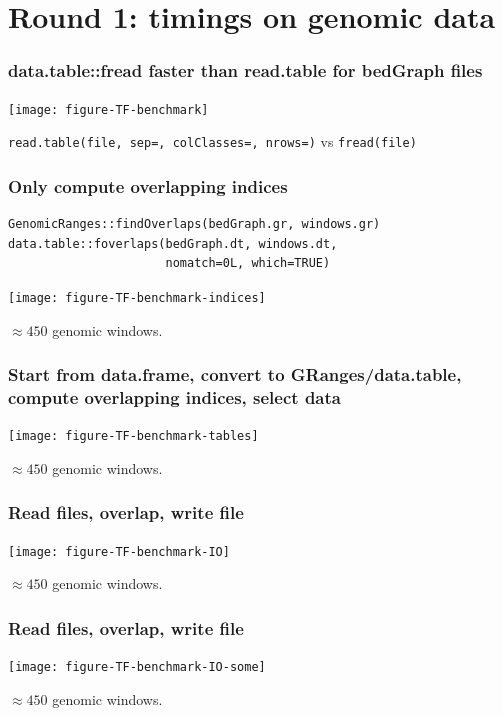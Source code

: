 \documentclass{beamer}
\begin{document}
\section{Round 1: timings on genomic data}

\begin{frame}
  \frametitle{data.table::fread faster than read.table for bedGraph
    files}
  \texttt{[image: figure-TF-benchmark]}

  \texttt{read.table(file, sep=, colClasses=, nrows=)} vs
  \texttt{fread(file)}
\end{frame}

\begin{frame}[fragile]
  \frametitle{Only compute overlapping indices}
\begin{verbatim}
GenomicRanges::findOverlaps(bedGraph.gr, windows.gr)
data.table::foverlaps(bedGraph.dt, windows.dt, 
                      nomatch=0L, which=TRUE)
\end{verbatim}

  \texttt{[image: figure-TF-benchmark-indices]}

  \vskip -0.5cm

  $\approx 450$ genomic windows.
\end{frame}

\begin{frame}
  \frametitle{Start from data.frame, convert to GRanges/data.table,
    compute overlapping indices, select data}
  \texttt{[image: figure-TF-benchmark-tables]}

  $\approx 450$ genomic windows.
\end{frame}

\begin{frame}
  \frametitle{Read files, overlap, write file}
  \texttt{[image: figure-TF-benchmark-IO]}

  $\approx 450$ genomic windows.
\end{frame}

\begin{frame}
  \frametitle{Read files, overlap, write file}
  \texttt{[image: figure-TF-benchmark-IO-some]}

  $\approx 450$ genomic windows.
\end{frame}


\end{document}
